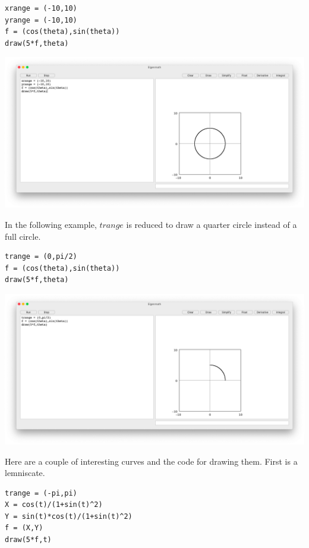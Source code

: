 \begin{Verbatim}[formatcom=\color{blue},samepage=true]
xrange = (-10,10)
yrange = (-10,10)
f = (cos(theta),sin(theta))
draw(5*f,theta)
\end{Verbatim}

\begin{center}
\includegraphics[scale=0.2]{circle.png}
\end{center}

In the following example, $trange$ is reduced
to draw a quarter circle instead of a full circle.

\begin{Verbatim}[formatcom=\color{blue},samepage=true]
trange = (0,pi/2)
f = (cos(theta),sin(theta))
draw(5*f,theta)
\end{Verbatim}

\begin{center}
\includegraphics[scale=0.2]{circle2.png}
\end{center}

Here are a couple of interesting curves and the code for drawing them.
First is a lemniscate.

\begin{Verbatim}[formatcom=\color{blue},samepage=true]
trange = (-pi,pi)
X = cos(t)/(1+sin(t)^2)
Y = sin(t)*cos(t)/(1+sin(t)^2)
f = (X,Y)
draw(5*f,t)
\end{Verbatim}

